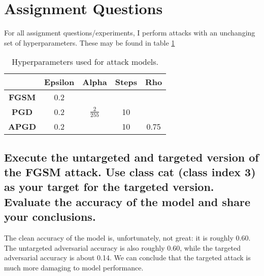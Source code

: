 \documentclass{article}
\begin{document}
\section{Assignment Questions}
        

For all assignment questions/experiments, I perform attacks with an unchanging set of hyperparameters.
These may be found in table \ref{tab:attack_hyperparameters}
\begin{table}
    \centering
    \begin{tabular}{c|c|c|c|c}
        & \textbf{Epsilon} & \textbf{Alpha} & \textbf{Steps} & \textbf{Rho} \\
        \hline
    \textbf{FGSM} & 0.2 & & & \\
    \textbf{PGD} & 0.2 & $\frac{2}{255}$ & 10 & \\
    \textbf{APGD} & 0.2 & & 10 & 0.75 
    \end{tabular}
    \caption{Hyperparameters used for attack models.}
    \label{tab:attack_hyperparameters}
\end{table}

\subsection{Execute the untargeted and targeted version of the FGSM attack.
Use class cat (class index 3) as your target for the targeted version. Evaluate
the accuracy of the model and share your conclusions.}
The clean accuracy of the model is, unfortunately, not great: it is roughly 0.60.
The untargeted adversarial accuracy is also roughly 0.60, while the targeted adversarial accuracy is about 0.14.
We can conclude that the targeted attack is much more damaging to model performance.
\end{document}
